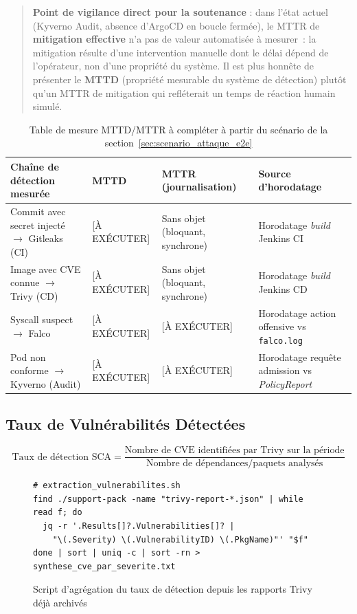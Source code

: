 \begin{quote}
\textbf{Point de vigilance direct pour la soutenance} : dans l'état actuel (Kyverno Audit, absence d'ArgoCD en boucle fermée), le MTTR de \textbf{mitigation effective} n'a pas de valeur automatisée à mesurer~: la mitigation résulte d'une intervention manuelle dont le délai dépend de l'opérateur, non d'une propriété du système. Il est plus honnête de présenter le \textbf{MTTD} (propriété mesurable du système de détection) plutôt qu'un MTTR de mitigation qui refléterait un temps de réaction humain simulé.
\end{quote}

\begin{table}[htbp]
\centering
\scriptsize
\begin{tabular}{@{}p{4.2cm}p{2.6cm}p{2.6cm}p{4cm}@{}}
\toprule
\textbf{Chaîne de détection mesurée} & \textbf{MTTD} & \textbf{MTTR (journalisation)} & \textbf{Source d'horodatage} \\
\midrule
Commit avec secret injecté $\rightarrow$ Gitleaks (CI) & [À EXÉCUTER] & Sans objet (bloquant, synchrone) & Horodatage \textit{build} Jenkins CI \\
Image avec CVE connue $\rightarrow$ Trivy (CD) & [À EXÉCUTER] & Sans objet (bloquant, synchrone) & Horodatage \textit{build} Jenkins CD \\
Syscall suspect $\rightarrow$ Falco & [À EXÉCUTER] & [À EXÉCUTER] & Horodatage action offensive vs \texttt{falco.log} \\
Pod non conforme $\rightarrow$ Kyverno (Audit) & [À EXÉCUTER] & [À EXÉCUTER] & Horodatage requête admission vs \textit{PolicyReport} \\
\bottomrule
\end{tabular}
\caption{Table de mesure MTTD/MTTR à compléter à partir du scénario de la section~\ref{sec:scenario_attaque_e2e}}
\label{tab:mttd_mttr_a_completer}
\end{table}

\subsection{Taux de Vulnérabilités Détectées}

\begin{equation}
\text{Taux de détection SCA} = \frac{\text{Nombre de CVE identifiées par Trivy sur la période}}{\text{Nombre de dépendances/paquets analysés}}
\end{equation}

\begin{figure}[htbp]
\centering
\begin{verbatim}
# extraction_vulnerabilites.sh
find ./support-pack -name "trivy-report-*.json" | while read f; do
  jq -r '.Results[]?.Vulnerabilities[]? |
    "\(.Severity) \(.VulnerabilityID) \(.PkgName)"' "$f"
done | sort | uniq -c | sort -rn > synthese_cve_par_severite.txt
\end{verbatim}
\caption{Script d'agrégation du taux de détection depuis les rapports Trivy déjà archivés}
\label{fig:script_cve}
\end{figure}

